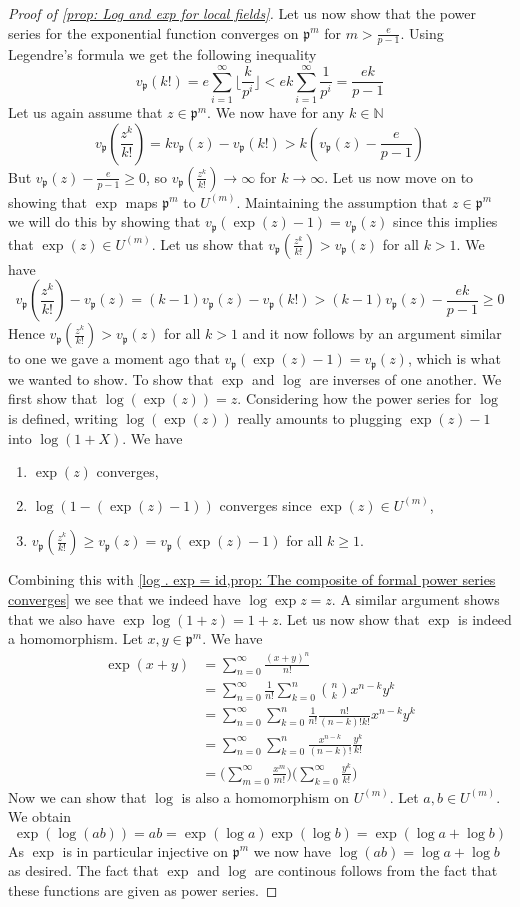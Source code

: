 \documentclass{article}
\newcommand{\mfrak}[1]{\mathfrak{#1}}
\newcommand{\mbb}[1]{\mathbb{#1}}
\newcommand{\vp}{{v_{\mfrak p}}}
\numberwithin{equation}{section}
\begin{document}
\begin{proof}[Proof of \cref{prop: Log and exp for local fields}]
	Let us now show that the power series for the exponential function converges on $\mfrak p^m$ for $m > \frac{e}{p-1}$. Using Legendre's formula we get the following inequality
	$$\vp(k!) = e\sum_{i=1}^\infty \lfloor \frac{k}{p^i} \rfloor < ek \sum_{i=1}^\infty \frac{1}{p^i} = \frac{ek}{p-1}$$
	Let us again assume that $z \in \mfrak p^m$. We now have for any $k \in \mbb N$
	$$\vp(\frac{z^k}{k!}) = k\vp(z) - \vp(k!) > k(\vp(z) - \frac{e}{p-1})$$
	But $\vp(z) - \frac{e}{p-1} \geq 0$, so $\vp(\frac{z^k}{k!}) \to \infty$ for $k \to \infty$. Let us now move on to showing that $\exp$ maps $\mfrak p^m$ to $U^{(m)}$. Maintaining the assumption that $z \in \mfrak p^m$ we will do this by showing that $\vp(\exp(z) - 1) = \vp(z)$ since this implies that $\exp(z) \in U^{(m)}$. Let us show that $\vp(\frac{z^k}{k!}) > \vp(z)$ for all $k > 1$. We have
	$$\vp(\frac{z^k}{k!}) - \vp(z) = (k-1)\vp(z) - \vp(k!) > (k-1)\vp(z) - \frac{ek}{p-1} \geq 0$$
	Hence $\vp(\frac{z^k}{k!}) > \vp(z)$ for all $k > 1$ and it now follows by an argument similar to one we gave a moment ago that $\vp(\exp(z) - 1) = \vp(z)$, which is what we wanted to show. To show that $\exp$ and $\log$ are inverses of one another. We first show that $\log(\exp(z)) = z$. Considering how the power series for $\log$ is defined, writing $\log(\exp(z))$ really amounts to plugging $\exp(z) - 1$ into $\log(1 + X)$. We have 
	\begin{enumerate}
    	\item $\exp(z)$ converges,
    	\item $\log(1 - (\exp(z)-1))$ converges since $\exp(z) \in U^{(m)}$,
    	\item $\vp(\frac{z^k}{k!}) \geq \vp(z) = \vp(\exp(z)-1)$ for all $k \geq 1$.
	\end{enumerate}
	Combining this with \cref{log . exp = id,prop: The composite of formal power series converges} we see that we indeed have $\log \exp z = z$. A similar argument shows that we also have $\exp \log (1 + z) = 1 + z$. Let us now show that $\exp$ is indeed a homomorphism. Let $x,y \in \mfrak p^m$. We have
	\begin{align*}
    	\exp (x + y) &= \sum_{n = 0}^\infty \frac{(x+y)^n}{n!} \\
    	&= \sum_{n=0}^\infty \frac{1}{n!} \sum_{k = 0}^n \binom{n}{k} x^{n-k}y^k \\
    	&= \sum_{n=0}^\infty \sum_{k = 0}^n \frac{1}{n!}\frac{n!}{(n-k)!k!}x^{n-k}y^k \\
    	&= \sum_{n=0}^\infty \sum_{k = 0}^n \frac{x^{n-k}}{(n-k)!}\frac{y^k}{k!} \\
    	&= \bigl(\sum_{m = 0}^\infty \frac{x^m}{m!} \bigr)\bigl(\sum_{k = 0}^\infty \frac{y^k}{k!} \bigr)
	\end{align*}
	Now we can show that $\log$ is also a homomorphism on $U^{(m)}$. Let $a,b \in U^{(m)}$. We obtain
	$$\exp(\log(ab)) = ab = \exp(\log a) \exp(\log b) = \exp(\log a + \log b)$$
	As $\exp$ is in particular injective on $\mfrak p^{m}$ we now have $\log(ab) = \log a + \log b$ as desired. The fact that $\exp$ and $\log$ are continous follows from the fact that these functions are given as power series.
\end{proof}
\end{document}
